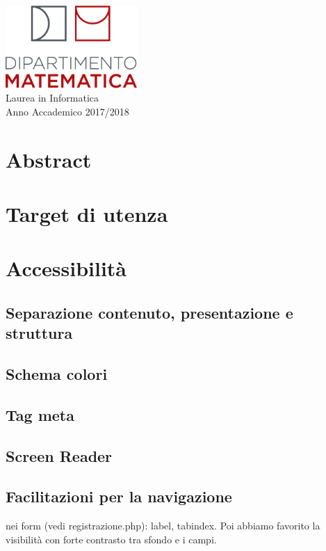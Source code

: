 \documentclass[10pt, a4paper]{article}
\newcommand{\normsize}{\fontsize{15pt}{10pt}\selectfont}
\begin{document}
\begin{titlepage}
\vspace*{8px}

\includegraphics[width=50mm]{Images/dip_mat.png}\\
\vspace*{\fill} %
\vspace*{3px}
{\normsize Laurea in Informatica\\ }
\vspace*{0.25px}
{\small Anno Accademico 2017/2018\\ }


\end{titlepage}
\tableofcontents

\section{Abstract}

\section{Target di utenza}

\section{Accessibilità}
	\subsection{Separazione contenuto, presentazione e struttura}
	\subsection{Schema colori}
	\subsection{Tag meta}
	\subsection{Screen Reader}
	\subsection{Facilitazioni per la navigazione}
		nei form (vedi registrazione.php): label, tabindex. Poi abbiamo favorito la visibilità con forte contrasto tra sfondo e i campi.
\end{document}

